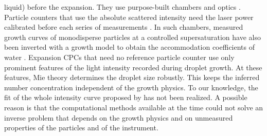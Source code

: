 \documentclass[preprint,review,12pt,authoryear]{elsarticle}
\begin{document}
liquid) before the expansion.
They use purpose-built chambers and optics \citep{kurten2005automated,pinterich2016vsanc}.
Particle counters that use the absolute scattered intensity need the laser power calibrated before
each series of measurements \citep{kurten2005automated,saghafifar2009modified}.
In such chambers, measured growth curves of monodisperse particles at a controlled supersaturation
have also been inverted with a growth model to obtain the accommodation coefficients of water
\citep{winkler2004mass}.
Expansion CPCs that need no reference particle counter use only prominent features of the light intensity
recorded during droplet growth. At these features, Mie theory determines the droplet size robustly.
This keeps the inferred number concentration independent of the growth physics.
To our knowledge, the fit of the whole intensity curve proposed by \citet{saghafifar2009modified} has not
been realized. A possible reason is that the computational methods available at the time could not solve an
inverse problem
that depends on the growth physics and on unmeasured properties of the particles and of the
instrument.
\end{document}
